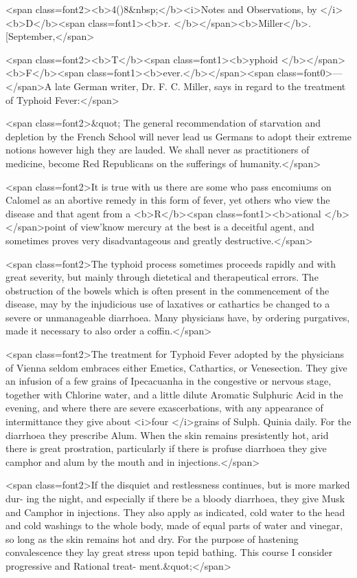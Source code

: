 <span class=font2><b>4()8&nbsp;</b><i>Notes and Observations, by </i><b>D</b><span class=font1><b>r. </b></span><b>Miller</b>. [September,</span>

<span class=font2><b>T</b><span class=font1><b>yphoid </b></span><b>F</b><span class=font1><b>ever.</b></span><span class=font0>—</span>A late German writer, Dr. F. C. Miller, says in
regard to the treatment of Typhoid Fever:</span>

<span class=font2>&quot; The general recommendation of starvation and depletion by the
French School will never lead us Germans to adopt their extreme notions
however high they are lauded. We shall never as practitioners of
medicine, become Red Republicans on the sufferings of humanity.</span>

<span class=font2>It is true with us there are some who pass encomiums on Calomel as an
abortive remedy in this form of fever, yet others who view the disease
and that agent from a <b>R</b><span class=font1><b>ational </b></span>point of view'know mercury at the
best is a deceitful agent, and sometimes proves very disadvantageous
and greatly destructive.</span>

<span class=font2>The typhoid process sometimes proceeds rapidly and with great
severity, but mainly through dietetical and therapeutical errors. The
obstruction of the bowels which is often present in the commencement
of the disease, may by the injudicious use of laxatives or cathartics
be changed to a severe or unmanageable diarrhoea. Many physicians
have, by ordering purgatives, made it necessary to also order a coffin.</span>

<span class=font2>The treatment for Typhoid Fever adopted by the physicians of
Vienna seldom embraces either Emetics, Cathartics, or Venesection.
They give an infusion of a few grains of Ipecacuanha in the congestive
or nervous stage, together with Chlorine water, and a little dilute
Aromatic Sulphuric Acid in the evening, and where there are severe
exascerbations, with any appearance of intermittance they give about
<i>four </i>grains of Sulph. Quinia daily. For the diarrhoea they prescribe
Alum. When the skin remains presistently hot, arid there is great
prostration, particularly if there is profuse diarrhoea they give camphor
and alum by the mouth and in injections.</span>

<span class=font2>If the disquiet and restlessness continues, but is more marked dur-
ing the night, and especially if there be a bloody diarrhoea, they give
Musk and Camphor in injections. They also apply as indicated, cold
water to the head and cold washings to the whole body, made of equal
parts of water and vinegar, so long as the skin remains hot and dry.
For the purpose of hastening convalescence they lay great stress upon
tepid bathing. This course I consider progressive and Rational treat-
ment.&quot;</span>

